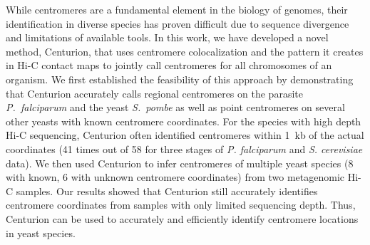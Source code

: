 While centromeres are a fundamental element in the biology of genomes, their
identification in diverse species has proven difficult due to sequence
divergence and limitations of available tools. In this work, we have
developed a novel method, Centurion, that uses centromere colocalization and
the pattern it creates in Hi-C contact maps to jointly call centromeres for
all chromosomes of an organism.
We first established the feasibility of this approach by demonstrating
that Centurion accurately calls regional centromeres on the parasite
\textit{P.\ falciparum} and the yeast \textit{S.\ pombe} as well as
point centromeres on several other yeasts with known centromere
coordinates.
For the species with high depth Hi-C sequencing, Centurion often identified
centromeres within 1~kb of the actual coordinates (41 times out of 58 for
three stages of \textit{P. falciparum} and \textit{S. cerevisiae} data). We
then used Centurion to infer centromeres of multiple yeast species (8 with
known, 6 with unknown centromere coordinates) from two metagenomic Hi-C
samples. Our results showed that Centurion still accurately identifies
centromere coordinates from samples with only limited sequencing depth. Thus,
Centurion can be used to accurately and efficiently identify centromere
locations in yeast species.

